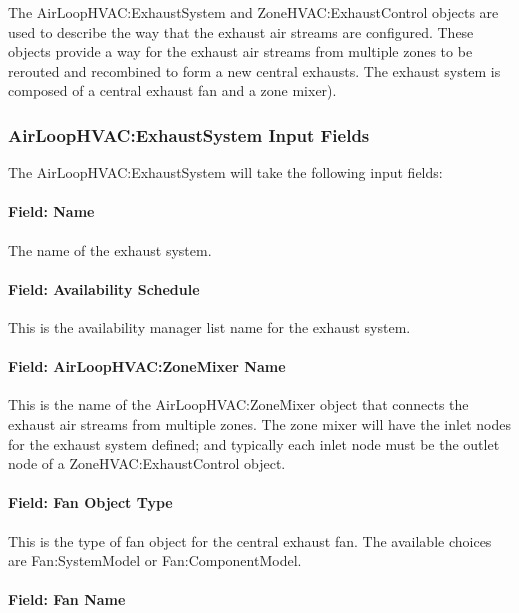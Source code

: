 The AirLoopHVAC:ExhaustSystem and ZoneHVAC:ExhaustControl objects are used to describe the way that the exhaust air streams are configured. These objects provide a way for the exhaust air streams from multiple zones to be rerouted and recombined to form a new central exhausts. The exhaust system is composed of a central exhaust fan and a zone mixer).

\subsubsection{AirLoopHVAC:ExhaustSystem Input Fields}

The AirLoopHVAC:ExhaustSystem will take the following input fields:

\paragraph{Field: Name}

The name of the exhaust system.

\paragraph{Field: Availability Schedule}

This is the availability manager list name for the exhaust system.

\paragraph{Field: AirLoopHVAC:ZoneMixer Name}

This is the name of the AirLoopHVAC:ZoneMixer object that connects the exhaust air streams from multiple zones. The zone mixer will have the inlet nodes for the exhaust system defined; and typically each inlet node must be the outlet node of a ZoneHVAC:ExhaustControl object.

\paragraph{Field: Fan Object Type}

This is the type of fan object for the central exhaust fan. The available choices are Fan:SystemModel or Fan:ComponentModel.

\paragraph{Field: Fan Name}

